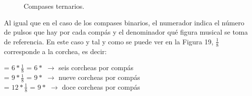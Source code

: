 \documentclass[a4paper, openright, 11pt, titlepage]{report}
\theoremstyle{definition}\newtheorem{defin}[propo]{Definition}
\theoremstyle{definition}\newtheorem{obser}[propo]{Remark}
\theoremstyle{definition}\newtheorem{ejem}[propo]{Ejemplo}
\theoremstyle{definition}\newtheorem{algoritmo}[propo]{Algoritmo}
\begin{document}
 \begin{figure}[H]
        \centering
         \hspace{1.7cm}
            \hspace{1.7cm}
            \hspace{1.7cm}
        \caption{Compases ternarios.}
\end{figure}
Al igual que en el caso de los compases binarios, el numerador indica el número de pulsos que hay por cada compás y el denominador qué figura musical se toma de referencia. En este caso y tal y como se puede ver en la Figura 19, $\frac{1}{8}$ corresponde a la corchea, es decir:
\begin{center}
     = $6 * \frac{1}{8}$ = $6 * $\musEighth \hspace{0.3cm} $\longrightarrow$ \hspace{0.3cm} seis corcheas por compás\\
     = $9 * \frac{1}{8}$ = $9 * $\musEighth \hspace{0.3cm} $\longrightarrow$ \hspace{0.3cm} nueve corcheas por compás\\
     = $12 * \frac{1}{8}$ = $9 * $\musEighth \hspace{0.3cm} $\longrightarrow$ \hspace{0.3cm} doce corcheas por compás\\
\end{center}
\end{document}
